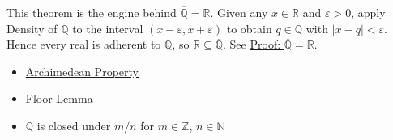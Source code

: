 \begin{remark*}[Why this completes $\overline{\mathbb{Q}} = \mathbb{R}$]
This theorem is the engine behind $\overline{\mathbb{Q}} = \mathbb{R}$.
Given any $x \in \mathbb{R}$ and $\varepsilon > 0$, apply Density of $\mathbb{Q}$
to the interval $(x - \varepsilon, x + \varepsilon)$ to obtain
$q \in \mathbb{Q}$ with $|x - q| < \varepsilon$.
Hence every real is adherent to $\mathbb{Q}$, so $\mathbb{R} \subseteq \overline{\mathbb{Q}}$.
See \hyperref[prf:closure-rationals]{Proof: $\overline{\mathbb{Q}} = \mathbb{R}$}.
\end{remark*}

\begin{dependencies}
\begin{itemize}
  \item \hyperref[prf:archimedean-property]{Archimedean Property}
  \item \hyperref[prf:floor-lemma]{Floor Lemma}
  \item $\mathbb{Q}$ is closed under $m/n$ for $m \in \mathbb{Z}$, $n \in \mathbb{N}$
\end{itemize}
\end{dependencies}
